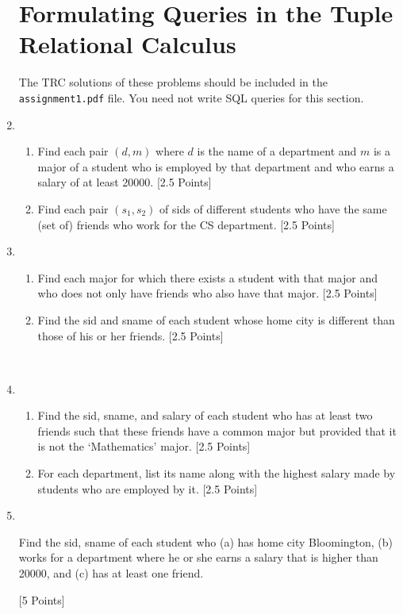 \documentclass{article}
\begin{document}
\begin{enumerate}[resume]
\section{Formulating Queries in the Tuple Relational Calculus}
The TRC solutions of these problems should be included in the {\tt assignment1.pdf} file. You need not write SQL queries for this section.


\item  \ 

\begin{enumerate}
\item   Find each pair $(d, m)$ where $d$ is the name of a department and $m$ is a major of a student who is employed by that department and who earns a salary of at least 20000. [2.5 Points]
\item   Find each pair $(s_1,s_2)$ of sids of different students who have the same (set of) friends who work for the CS department. [2.5 Points]
\end{enumerate}

\item  \ 

\begin{enumerate}
\item    Find each major for which there exists a student with that major and who does not only have friends who also have that major. [2.5 Points]
\item   Find the sid and sname of each student whose home city is different than those of his or her friends. [2.5 Points]  \\ 

\end{enumerate}
\\

\item  \ 

\begin{enumerate}
\item  Find the sid, sname, and salary of each student who has at least two friends such that these friends have a common major but provided that it is not the `Mathematics' major. [2.5 Points]
\item  For each department, list its name along with the highest salary made by students who are employed by it. [2.5 Points]
\end{enumerate}


\item  \ 
\begin{enumerate}
  Find the sid, sname of each student who
(a) has home city Bloomington, 
(b) works for a department where he or she earns a salary that is higher than 20000, and 
(c) has at least one friend.

[5 Points]
 
\end{enumerate}
\end{enumerate}
\end{document}
